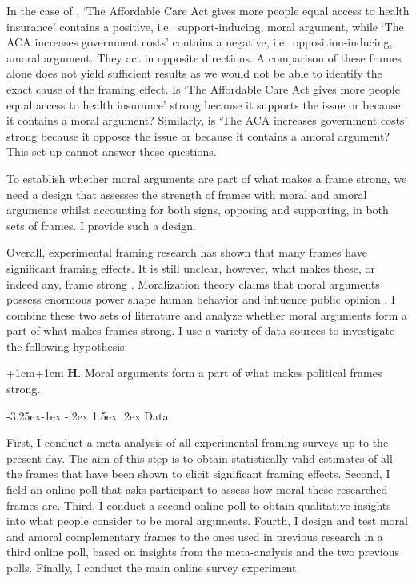 \documentclass[12pt,]{article}
\makeatletter
\renewcommand\subsection{\@startsection{subsection}{2}{\z@}%
                                     {-3.25ex\@plus -1ex \@minus -.2ex}
                                     {1.5ex \@plus .2ex}
                                     {\normalsize\bfseries}} %
\makeatother
\begin{document}
In the case of \citet{druckman_source_2012}, `The Affordable Care Act
gives more people equal access to health insurance' contains a positive,
i.e.~support-inducing, moral argument, while `The ACA increases
government costs' contains a negative, i.e.~opposition-inducing, amoral
argument. They act in opposite directions. A comparison of these frames
alone does not yield sufficient results as we would not be able to
identify the exact cause of the framing effect. Is `The Affordable Care
Act gives more people equal access to health insurance' strong because
it supports the issue or because it contains a moral argument?
Similarly, is `The ACA increases government costs' strong because it
opposes the issue or because it contains a amoral argument? This set-up
cannot answer these questions.

To establish whether moral arguments are part of what makes a frame
strong, we need a design that assesses the strength of frames with moral
and amoral arguments whilst accounting for both signs, opposing and
supporting, in both sets of frames. I provide such a design.

Overall, experimental framing research has shown that many frames have
significant framing effects. It is still unclear, however, what makes
these, or indeed any, frame strong \citep{druckman_political_2018}.
Moralization theory claims that moral arguments possess enormous power
shape human behavior and influence public opinion
\citep{haidt_moral_2003}. I combine these two sets of literature and
analyze whether moral arguments form a part of what makes frames strong.
I use a variety of data sources to investigate the following hypothesis:

\vspace{0.3cm}

\begin{adjustwidth*}{+1cm}{+1cm}
\textbf{H.} Moral arguments form a part of what makes political frames strong.
\end{adjustwidth*}

\subsection{Data}\label{framing-data}

First, I conduct a meta-analysis of all experimental framing surveys up
to the present day. The aim of this step is to obtain statistically
valid estimates of all the frames that have been shown to elicit
significant framing effects. Second, I field an online poll that asks
participant to assess how moral these researched frames are. Third, I
conduct a second online poll to obtain qualitative insights into what
people consider to be moral arguments. Fourth, I design and test moral
and amoral complementary frames to the ones used in previous research in
a third online poll, based on insights from the meta-analysis and the
two previous polls. Finally, I conduct the main online survey
experiment.
\end{document}
